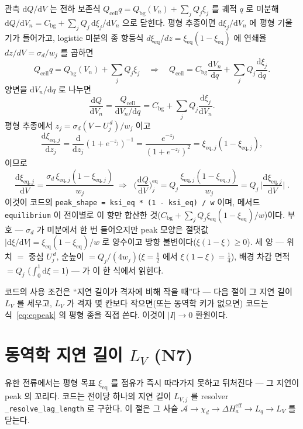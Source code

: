 \documentclass[11pt,a4paper]{article}
\newcommand{\dd}{\mathrm{d}}
\newcommand{\eff}{\mathrm{eff}}
\newcommand{\eq}{\mathrm{eq}}
\newcommand{\cell}{\mathrm{cell}}
\newcommand{\bg}{\mathrm{bg}}
\newcommand{\code}[1]{\texttt{#1}}
\begin{document}
관측 $\dd Q/\dd V$ 는 전하 보존식 $Q_\cell q=Q_\bg(V_n)+\sum_jQ_j\xi_j$ 를 궤적 $q$ 로 미분해
$\dd Q/\dd V_n=C_\bg+\sum_jQ_j\,\dd\xi_j/\dd V_n$ 으로 닫힌다. 평형 추종이면 $\dd\xi_j/\dd V_n$ 에 평형 기울기가 들어가고,
logistic 미분의 종 항등식 $d\xi_\eq/dz=\xi_\eq(1-\xi_\eq)$ 에 연쇄율 $dz/dV=\sigma_d/w_j$ 를 곱하면
\begin{equation}
Q_\cell q=Q_\bg(V_n)+\sum_jQ_j\xi_j
\quad\Longrightarrow\quad
Q_\cell=C_\bg\frac{\dd V_n}{\dd q}+\sum_jQ_j\frac{\dd\xi_j}{\dd q}.
\label{eq:eqpeakderiveA}
\end{equation}
양변을 $\dd V_n/\dd q$ 로 나누면
\begin{equation}
\frac{\dd Q}{\dd V_n}
=\frac{Q_\cell}{\dd V_n/\dd q}
=C_\bg+\sum_jQ_j\frac{\dd\xi_j}{\dd V_n}.
\label{eq:eqpeakderiveB}
\end{equation}
평형 추종에서 $z_j=\sigma_d(V-U_j^{\,d})/w_j$ 이고
\begin{equation}
\frac{\dd\xi_{\eq,j}}{\dd z_j}
=\frac{\dd}{\dd z_j}(1+e^{-z_j})^{-1}
=\frac{e^{-z_j}}{(1+e^{-z_j})^2}
=\xi_{\eq,j}(1-\xi_{\eq,j}),
\label{eq:eqpeakderiveC}
\end{equation}
이므로
\begin{equation}
\frac{\dd\xi_{\eq,j}}{\dd V}=\frac{\sigma_d\,\xi_{\eq,j}(1-\xi_{\eq,j})}{w_j}
\;\Longrightarrow\;
\boxed{\;\Big(\frac{\dd Q}{\dd V}\Big)^\eq_j
=Q_j\,\frac{\xi_{\eq,j}(1-\xi_{\eq,j})}{w_j}
=Q_j\,\Big|\frac{\dd\xi_{\eq,j}}{\dd V}\Big|\;.}
\label{eq:eqpeak}
\end{equation}
이것이 코드의 \code{peak\_shape = ksi\_eq * (1 - ksi\_eq) / w} 이며, 메서드 \code{equilibrium} 이 전이별로 이 항만
합산한 것($C_\bg+\sum_jQ_j\xi_\eq(1-\xi_\eq)/w$)이다. 부호 — $\sigma_d$ 가 미분에서 한 번 들어오지만 peak 모양은
절댓값 $|\dd\xi/\dd V|=\xi_\eq(1-\xi_\eq)/w$ 로 양수이고 방향 불변이다($\xi(1-\xi)\ge0$). 세 양 — 위치 $=$ 중심
$U_j^{\,d}$, 순높이 $=Q_j/(4w_j)$($\xi=\tfrac12$ 에서 $\xi(1-\xi)=\tfrac14$), 배경 차감 면적 $=Q_j$
($\int_0^1\dd\xi=1$) — 가 이 한 식에서 읽힌다.

코드의 사용 조건은 ``지연 길이가 격자에 비해 작을 때''다 — 다음 절이 그 지연 길이 $L_V$ 를 세우고, $L_V$ 가 격자
몇 칸보다 작으면(또는 동역학 키가 없으면) 코드는 식~\eqref{eq:eqpeak} 의 평형 종을 직접 쓴다. 이것이 $|I|\to0$ 환원이다.

\section{동역학 지연 길이 $L_V$ (N7)}\label{sec:lag}
유한 전류에서는 평형 목표 $\xi_\eq$ 를 점유가 즉시 따라가지 못하고 뒤처진다 — 그 지연이 peak 의 꼬리다. 코드는 전이당
하나의 지연 길이 $L_{V,j}$ 를 resolver \code{\_resolve\_lag\_length} 로 구한다. 이 절은 그 사슬
$\mathcal A\to\chi_d\to\Delta H_a^\eff\to L_q\to L_V$ 를 닫는다.
\end{document}
